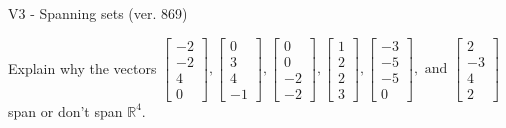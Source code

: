 \begin{exercise}
  \begin{exerciseTitle}V3 - Spanning sets (ver. 869)\end{exerciseTitle}
  \begin{exerciseStatement}
    Explain why the vectors \(\left[\begin{array}{r}
-2 \\
-2 \\
4 \\
0
\end{array}\right] , \left[\begin{array}{r}
0 \\
3 \\
4 \\
-1
\end{array}\right] , \left[\begin{array}{r}
0 \\
0 \\
-2 \\
-2
\end{array}\right] , \left[\begin{array}{r}
1 \\
2 \\
2 \\
3
\end{array}\right] , \left[\begin{array}{r}
-3 \\
-5 \\
-5 \\
0
\end{array}\right] , \text{ and } \left[\begin{array}{r}
2 \\
-3 \\
4 \\
2
\end{array}\right]\) span or don't span \(\mathbb{R}^4\). 
	



\end{exerciseStatement}
\end{exercise}
